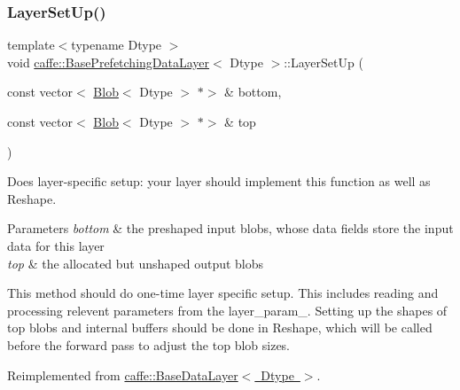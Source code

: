 \subsubsection{\texorpdfstring{Layer\+Set\+Up()}{LayerSetUp()}\hspace{0.1cm}{\footnotesize\ttfamily [1/2]}}
{\footnotesize\ttfamily template$<$typename Dtype $>$ \\
void \mbox{\hyperlink{classcaffe_1_1_base_prefetching_data_layer}{caffe\+::\+Base\+Prefetching\+Data\+Layer}}$<$ Dtype $>$\+::Layer\+Set\+Up (\begin{DoxyParamCaption}\item[{const vector$<$ \mbox{\hyperlink{classcaffe_1_1_blob}{Blob}}$<$ Dtype $>$ $\ast$$>$ \&}]{bottom,  }\item[{const vector$<$ \mbox{\hyperlink{classcaffe_1_1_blob}{Blob}}$<$ Dtype $>$ $\ast$$>$ \&}]{top }\end{DoxyParamCaption})\hspace{0.3cm}{\ttfamily [virtual]}}



Does layer-\/specific setup\+: your layer should implement this function as well as Reshape. 


\begin{DoxyParams}{Parameters}
{\em bottom} & the preshaped input blobs, whose data fields store the input data for this layer \\
\hline
{\em top} & the allocated but unshaped output blobs\\
\hline
\end{DoxyParams}
This method should do one-\/time layer specific setup. This includes reading and processing relevent parameters from the {\ttfamily layer\+\_\+param\+\_\+}. Setting up the shapes of top blobs and internal buffers should be done in {\ttfamily Reshape}, which will be called before the forward pass to adjust the top blob sizes. 

Reimplemented from \mbox{\hyperlink{classcaffe_1_1_base_data_layer_a7028919adf87326b808a2c7b21e8e927}{caffe\+::\+Base\+Data\+Layer$<$ Dtype $>$}}.

\mbox{\label{classcaffe_1_1_base_prefetching_data_layer_ad3b7914abaa6d46c148864c0e28204ad}} 
